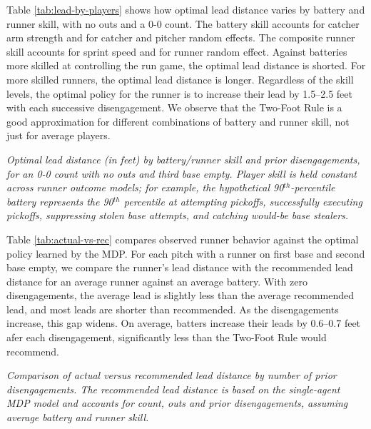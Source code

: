 \documentclass{article}
\begin{document}
      Table \ref{tab:lead-by-players} shows how optimal lead distance varies by battery and runner skill, with no outs and a 0-0 count. The battery skill accounts for catcher arm strength and for catcher and pitcher random effects. The composite runner skill accounts for sprint speed and for runner random effect. Against batteries more skilled at controlling the run game, the optimal lead distance is shorted. For more skilled runners, the optimal lead distance is longer. Regardless of the skill levels, the optimal policy for the runner is to increase their lead by 1.5--2.5 feet with each successive disengagement. We observe that the Two-Foot Rule is a good approximation for different combinations of battery and runner skill, not just for average players.
    
      \begin{table}[H]
        \centering
        
        \caption{
          \it Optimal lead distance (in feet) by battery/runner skill and prior disengagements, for an 0-0 count with no outs and third base empty. Player skill is held constant across runner outcome models; for example, the hypothetical 90$^{th}$-percentile battery represents the 90$^{th}$ percentile at attempting pickoffs, successfully executing pickoffs, suppressing stolen base attempts, and catching would-be base stealers.
        }
        \label{tab:lead-by-players}
      \end{table}

      Table \ref{tab:actual-vs-rec} compares observed runner behavior against the optimal policy learned by the MDP. For each pitch with a runner on first base and second base empty, we compare the runner's lead distance with the recommended lead distance for an average runner against an average battery. With zero disengagements, the average lead is slightly less than the average recommended lead, and most leads are shorter than recommended. As the disengagements increase, this gap widens. On average, batters increase their leads by 0.6--0.7 feet afer each disengagement, significantly less than the Two-Foot Rule would recommend.

      \begin{table}[H]
        \centering
        
        \caption{
          \it Comparison of actual versus recommended lead distance by number of prior disengagements. The recommended lead distance is based on the single-agent MDP model and accounts for count, outs and prior disengagements, assuming average battery and runner skill.
        }
        \label{tab:actual-vs-rec}
      \end{table}
\end{document}
